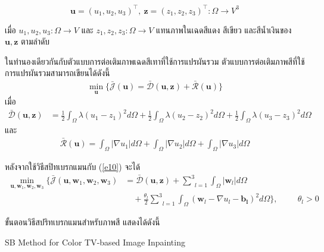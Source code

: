 	$$ \boldsymbol{u} = (u_1,u_2,u_3)^{\top},\ \boldsymbol{z} = (z_1,z_2,z_3)^{\top} : \Omega  \rightarrow V^3 $$
	
	\noindent เมื่อ $u_1,u_2,u_3: \Omega  \rightarrow V$ และ $z_1,z_2,z_3: \Omega  \rightarrow V$ แทนภาพในเฉดสีแดง สีเขียว และสีน้ำเงินของ $\boldsymbol{u},\boldsymbol{z}$ ตามลำดับ 
	
	\hspace{1cm} ในทำนองเดียวกันกับตัวแบบการต่อเติมภาพเฉดสีเทาที่ใช้การแปรผันรวม ตัวแบบการต่อเติมภาพสีที่ใช้การแปรผันรวมสามารถเขียนได้ดังนี้
	\begin{align}
	\min_{\boldsymbol{u}} \{ \bar{\mathcal{J}}(\boldsymbol{u})= \mathcal{\bar{D}}(\boldsymbol{u},\boldsymbol{z})+  \mathcal{\bar{R}}(\boldsymbol{u}) \}
	\label{e10}
	\end{align}
	เมื่อ
	\begin{align*}
	\mathcal{\bar{D}}(\boldsymbol{u},\boldsymbol{z}) 
	&= \frac{1}{2}\int_{\Omega}^{}\lambda(u_1 - z_1)^2 d\Omega + \frac{1}{2}\int_{\Omega}^{}\lambda(u_2 - z_2)^2 d\Omega + \frac{1}{2}\int_{\Omega}^{}\lambda(u_3 - z_3)^2 d\Omega
	\end{align*}
	และ 
	\begin{align*}
	\mathcal{\bar{R}}(\boldsymbol{u})= \int_{\Omega}^{}\lvert\nabla u_1 \rvert d\Omega + \int_{\Omega}^{}\lvert\nabla u_2 \rvert d\Omega + \int_{\Omega}^{}\lvert\nabla u_3 \rvert d\Omega
	\end{align*}
	
	\hspace{1cm}  หลังจากใช้วิธีสปิทเบรกแมนกับ (\ref{e10}) จะได้
	\begin{align}
	\min_{\boldsymbol{u},\boldsymbol{w}_1,\boldsymbol{w}_2,\boldsymbol{w}_3} \{\bar{\mathcal{J}}(\boldsymbol{u},\boldsymbol{w}_1,\boldsymbol{w}_2,\boldsymbol{w}_3)&= \mathcal{\bar{D}}(\boldsymbol{u},\boldsymbol{z}) +  \underset{l=1}{\overset{3}{\sum}} \int_{\Omega}^{}|\boldsymbol{w}_l|d\Omega
	\nonumber\\
	&\quad+ \frac{\theta_l}{2} \underset{l=1}{\overset{3}{\sum}}\int_{\Omega}^{}(\boldsymbol{w}_l - \nabla u_l - \boldsymbol{b_l})^{2}d\Omega\}, \hspace{1cm} \theta_l > 0
	\end{align}
	
	\vspace{1cm}
	\hspace{1cm}ขั้นตอนวิธีสปริทเบรกแมนสำหรับภาพสี แสดงได้ดังนี้ 
	\vspace{0.5cm}
	
	\begin{algorithm}[H]
		\SetAlgoNoLine
		\caption{SB Method for Color TV-based Image Inpainting}
	\end{algorithm}
	\vspace{1cm}
